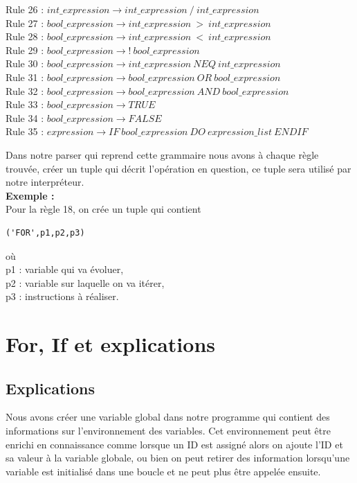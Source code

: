 \documentclass[report,10pt,a4paper]{memoir}
\begin{document}
\begin{flushleft}
Rule 26 : $int\_expression \rightarrow int\_expression\ /\ int\_expression$\\
Rule 27 : $bool\_expression \rightarrow int\_expression\ >\ int\_expression$\\
Rule 28 : $bool\_expression \rightarrow int\_expression\ <\ int\_expression$\\
Rule 29 : $bool\_expression \rightarrow !\ bool\_expression$\\
Rule 30 : $bool\_expression \rightarrow int\_expression\ NEQ\ int\_expression$\\
Rule 31 : $bool\_expression \rightarrow bool\_expression\ OR\ bool\_expression$\\
Rule 32 : $bool\_expression \rightarrow bool\_expression\ AND\ bool\_expression$\\
Rule 33 : $bool\_expression \rightarrow TRUE$\\
Rule 34 : $bool\_expression \rightarrow FALSE$\\
Rule 35 : $expression \rightarrow IF\ bool\_expression\ DO\ expression\_list\ ENDIF$\\
\end{flushleft}

Dans notre parser qui reprend cette grammaire nous avons à chaque règle trouvée, créer un tuple qui décrit l'opération en question, ce tuple sera utilisé par notre interpréteur. \\


\textbf{Exemple :}\\
Pour la règle 18, on crée un tuple qui contient 
\begin{verbatim}
('FOR',p1,p2,p3)
\end{verbatim}
où \\p1 : variable qui va évoluer,\\ p2 : variable sur laquelle on va itérer,\\ p3 : instructions à réaliser. 

\section*{For, If et explications}
\subsection*{Explications}
Nous avons créer une variable global dans notre programme qui contient des informations sur l'environnement des variables.
Cet environnement peut être enrichi en connaissance comme lorsque un ID est assigné alors on ajoute l'ID et sa valeur à la variable globale, ou bien on peut retirer des information lorsqu'une variable est initialisé dans une boucle et ne peut plus être appelée ensuite.
\end{document}
